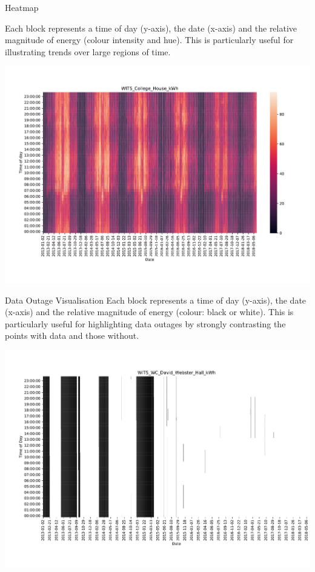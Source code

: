 \documentclass[8pt,xcolor={dvipsnames}]{beamer}
\begin{document}
{\begin{frame}{Heatmap}

Each block represents a time of day (y-axis), the date (x-axis) and the relative magnitude of energy (colour intensity and hue).
This is particularly useful for illustrating trends over large regions of time. 

\begin{center}
	\includegraphics[width=\textwidth, trim=30 50 70 50, clip]{HeatMapCollegeHouse}
\end{center}
\end{frame}


\begin{frame}{Data Outage Visualisation}
Each block represents a time of day (y-axis), the date (x-axis) and the relative magnitude of energy (colour: black or white).
This is particularly useful for highlighting data outages by strongly contrasting the points with data and those without. 

\begin{center}
	\includegraphics[width=\textwidth, trim=30 30 0 50, clip]{DataOutageDavidWebster}
\end{center}
\end{frame}


}
\end{document}
